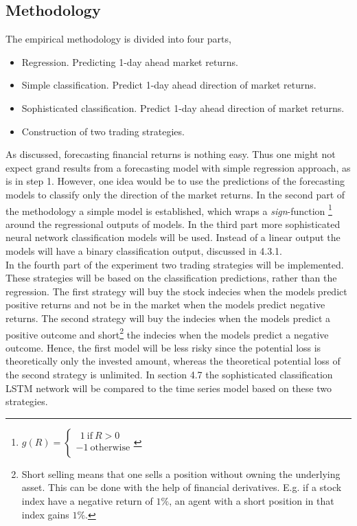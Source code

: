 \documentclass[12pt, letterpaper]{amsart}%
\begin{document}
\subsection{Methodology}
The empirical methodology is divided into four parts,
\\

\begin{itemize}  
\item Regression. Predicting 1-day ahead market returns.
\item Simple classification. Predict 1-day ahead direction of market returns.
\item Sophisticated classification. Predict 1-day ahead direction of market returns.
\item Construction of two trading strategies.
\end{itemize}
\vspace{0.5cm}

As discussed, forecasting financial returns is nothing easy. Thus one might not expect grand results from a forecasting model with simple regression approach, as is in step 1. However, one idea would be to use the predictions of the forecasting models to classify only the direction of the market returns. In the second part of the methodology a simple model is established, which wraps a \textit{sign}-function \footnote{$g(R) = 
     \begin{cases}
       \ \ 1 \ \text{if} \ R > 0 \\
       -1 \ \text{otherwise} \\ 
     \end{cases}$} around the regressional outputs of models. In the third part more sophisticated neural network classification models will be used. Instead of a linear output the models will have a binary classification output, discussed in 4.3.1.
\\

In the fourth part of the experiment two trading strategies will be implemented. These strategies will be based on the classification predictions, rather than the regression. The first strategy will buy the stock indecies when the models predict positive returns and not be in the market when the models predict negative returns. The second strategy will buy the indecies when the models predict a positive outcome and short\footnote{Short selling means that one sells a position without owning the underlying asset. This can be done with the help of financial derivatives. E.g. if a stock index have a negative return of $1\%$, an agent with a short position in that index gains $1\%$.} the indecies when the models predict a negative outcome. Hence, the first model will be less risky since the potential loss is theoretically only the invested amount, whereas the theoretical potential loss of the second strategy is unlimited. In section 4.7 the sophisticated classification LSTM network will be compared to the time series model based on these two strategies.
\\
\end{document}
